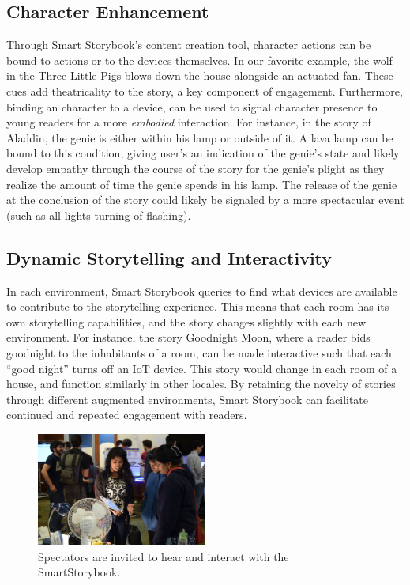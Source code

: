 \documentclass{sigchi}
\newcommand\name{SmartStorybook}
\begin{document}
\subsection{Character Enhancement}
Through Smart Storybook's content creation tool, character actions can be bound to actions or to the devices themselves. In our favorite example, the wolf in the Three Little Pigs blows down the house alongside an actuated fan. These cues add theatricality to the story, a key component of engagement. Furthermore, binding an character to a device, can be used to signal character presence to young readers for a more \textit{embodied} interaction. For instance, in the story of Aladdin, the genie is either within his lamp or outside of it. A lava lamp can be bound to this condition, giving user's an indication of the genie's state and likely develop empathy through the course of the story for the genie's plight as they realize the amount of time the genie spends in his lamp. The release of the genie at the conclusion of the story could likely be signaled by a more spectacular event (such as all lights turning of flashing). 


\subsection{Dynamic Storytelling and Interactivity}
In each environment, Smart Storybook queries to find what devices are available to contribute to the storytelling experience. This means that each room has its own storytelling capabilities, and the story changes slightly with each new environment. For instance, the story Goodnight Moon, where a reader bids goodnight to the inhabitants of a room, can be made interactive such that each ``good night'' turns off an IoT device. This story would change in each room of a house, and function similarly in other locales. By retaining the novelty of stories through different augmented environments, Smart Storybook can facilitate continued and repeated engagement with readers. 



\begin{figure}[t!]
    \centering
    \includegraphics[keepaspectratio, width=0.5\textwidth]{figures/demo.jpg} 
    \caption{Spectators are invited to hear and interact with the \name.}
    \vspace{-10pt}
    \label{fig:demo} 
  \end{figure}
\end{document}
